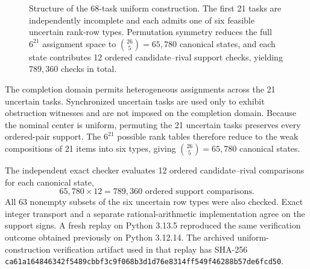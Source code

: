 \documentclass[preprint,11pt]{elsarticle}
\begin{document}
\begin{figure}[H]
\centering
{}
\caption{Structure of the 68-task uniform construction. The first 21 tasks are independently incomplete and each admits one of six feasible uncertain rank-row types. Permutation symmetry reduces the full $6^{21}$ assignment space to $\binom{26}{5}=65{,}780$ canonical states, and each state contributes 12 ordered candidate--rival support checks, yielding $789{,}360$ checks in total.}
\label{fig:app_structure}
\end{figure}

The completion domain permits heterogeneous assignments across the 21 uncertain tasks. Synchronized uncertain tasks are used only to exhibit obstruction witnesses and are not imposed on the completion domain. Because the nominal center is uniform, permuting the 21 uncertain tasks preserves every ordered-pair support. The $6^{21}$ possible rank tables therefore reduce to the weak compositions of 21 items into six types, giving $\binom{26}{5}=65{,}780$ canonical states.

The independent exact checker evaluates 12 ordered candidate--rival comparisons for each canonical state,
\begin{equation}\label{eq:app_checks}
65{,}780\times12=789{,}360\text{ ordered support comparisons.}
\end{equation}
All 63 nonempty subsets of the six uncertain row types were also checked. Exact integer transport and a separate rational-arithmetic implementation agree on the support signs. A fresh replay on Python 3.13.5 reproduced the same verification outcome obtained previously on Python 3.12.14. The archived uniform-construction verification artifact used in that replay has SHA-256 \texttt{ca61a164846342f5489cbbf3c9f068b3\allowbreak d1d76e8314ff549f46288b57de6fcd50}.
\end{document}

